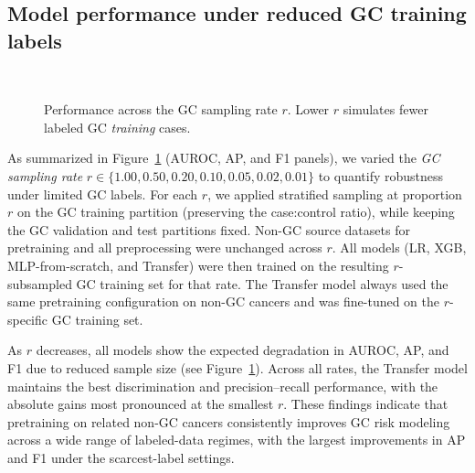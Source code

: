 \documentclass[diagnostics,article,submit,pdftex,moreauthors]{Definitions/mdpi}
\begin{document}
\subsection{Model performance under reduced GC training labels}
\begin{figure}[htbp]
\centering
{}
 \\
\caption{Performance across the GC sampling rate $r$. Lower $r$ simulates fewer labeled GC \emph{training} cases.\label{fig:model-gcrate}}
\end{figure}
As summarized in Figure~\ref{fig:model-gcrate} (AUROC, AP, and F1 panels), we varied the \emph{GC sampling rate} $r \in \{1.00, 0.50, 0.20, 0.10, 0.05, 0.02, 0.01\}$ to quantify robustness under limited GC labels.
For each $r$, we applied stratified sampling at proportion $r$ on the GC training partition (preserving the case{:}control ratio), while keeping the GC validation and test partitions fixed.
Non-GC source datasets for pretraining and all preprocessing were unchanged across $r$.
All models (LR, XGB, MLP-from-scratch, and Transfer) were then trained on the resulting $r$-subsampled GC training set for that rate.
The Transfer model always used the same pretraining configuration on non-GC cancers and was fine-tuned on the $r$-specific GC training set.

As $r$ decreases, all models show the expected degradation in AUROC, AP, and F1 due to reduced sample size (see Figure~\ref{fig:model-gcrate}).
Across all rates, the Transfer model maintains the best discrimination and precision--recall performance, with the absolute gains most pronounced at the smallest $r$.
These findings indicate that pretraining on related non-GC cancers consistently improves GC risk modeling across a wide range of labeled-data regimes, with the largest improvements in AP and F1 under the scarcest-label settings.
\end{document}
